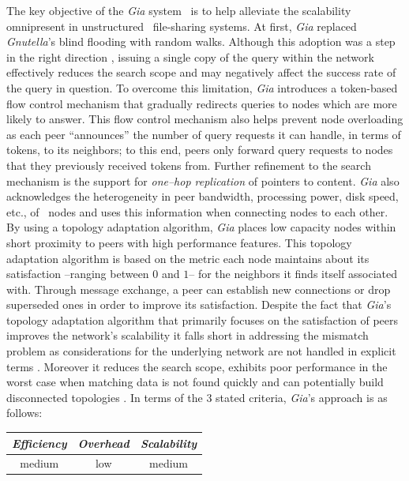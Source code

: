 The key objective of the {\sl Gia} system~\cite{CRBLS2003} is 
to help alleviate the scalability omnipresent
in unstructured \p\ file-sharing systems.
At first, {\sl Gia} replaced {\sl Gnutella}'s blind flooding 
with random walks.
Although this adoption was 
a step in the right direction \cite{LCCLS2002},
issuing a single copy of the query within the network
effectively reduces the search scope and may negatively affect 
the success rate of the query in question.
To overcome this limitation, {\sl Gia} introduces
a token-based flow control mechanism 
that gradually redirects queries to nodes which are more
likely to answer. This flow control mechanism also helps prevent node
overloading as each peer ``announces'' the number of query requests it 
can handle, in terms of tokens, to its neighbors; to this end, 
peers only forward query requests to nodes that they previously
received tokens from. Further refinement to the search mechanism is the
support for \emph{one--hop replication} of pointers to content.
{\sl Gia} also acknowledges the heterogeneity in peer bandwidth,
processing power, disk speed, etc., of \p\ nodes and uses this
information when connecting nodes to each other.
By using a topology adaptation algorithm, 
{\sl Gia} places low capacity nodes within 
short proximity to peers with high performance features.
This topology adaptation algorithm is based on the metric 
each node maintains about its satisfaction --ranging between $0$ and $1$--
for the neighbors it finds itself associated with. 
Through message exchange, a peer can establish new connections 
or drop superseded ones in order to improve its satisfaction.
Despite the fact that {\sl Gia}'s topology adaptation algorithm 
that primarily focuses on the satisfaction of peers improves the network's 
scalability it falls short in addressing the mismatch problem
as considerations for the underlying network are not handled in explicit
terms \cite{LXLNZ2005}. Moreover it reduces the search scope, exhibits poor
performance in the worst case when matching data is not found quickly
\cite{PR2004,HJ2004} and can potentially build  disconnected topologies
\cite{MBL2006}.
%
In terms of the $3$ stated criteria, {\sl Gia}'s approach is as follows:
\begin{center}
{\footnotesize
\begin{tabular}{ccc}
\emph{Efficiency} & \emph{Overhead} & \emph{Scalability} \\
\hline
medium &
low &
medium
\end{tabular}
}
\end{center}

